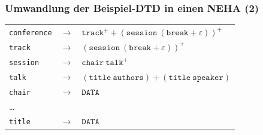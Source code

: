     \begin{frame}[t]
      \frametitle{Umwandlung der Beispiel-DTD in einen NEHA (2)}

      \par\vspace*{-2pt}
      \begin{exampleblock}{}
        \begin{footnotesize}
          \begin{center}
            \begin{tabular}{@{}lcl@{}}
              \texttt{conference} & $\to$ & $\texttt{track}^+ + (\texttt{session}~(\texttt{break} + \varepsilon))^+$ \\
              \texttt{track}      & $\to$ & $(\texttt{session}~(\texttt{break} + \varepsilon))^+$                    \\
              \texttt{session}    & $\to$ & $\texttt{chair}~ \texttt{talk}^+$                                        \\
              \texttt{talk}       & $\to$ & $(\texttt{title}~\texttt{authors}) + (\texttt{title}~\texttt{speaker})$  \\
              \texttt{chair}      & $\to$ & $\texttt{DATA}$                                                          \\
              \dots               &       &                                                                          \\
              \texttt{title}      & $\to$ & $\texttt{DATA}$
            \end{tabular}
          \end{center}
          \par
        \end{footnotesize}
      \end{exampleblock}



\end{frame}
